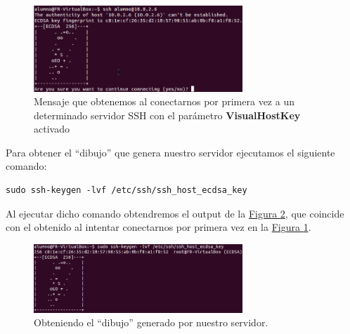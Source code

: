 \documentclass[10pt,a4paper,spanish]{article}
\begin{document}
\begin{figure}[!h]
    \centering
    \includegraphics[width=0.7\textwidth]{visualhostkey}
    \caption{Mensaje que obtenemos al conectarnos por primera vez a un determinado servidor SSH con el parámetro \textbf{VisualHostKey} activado}
    \label{visualhostkey}
\end{figure}

Para obtener el ``dibujo'' que genera nuestro servidor ejecutamos el siguiente comando:
\begin{verbatim}
sudo ssh-keygen -lvf /etc/ssh/ssh_host_ecdsa_key
\end{verbatim}

Al ejecutar dicho comando obtendremos el output de la \hyperref[visualhostkey1]{Figura \ref*{visualhostkey1}}, que coincide con el obtenido al intentar conectarnos por primera vez en la \hyperref[visualhostkey]{Figura \ref*{visualhostkey}}.

\begin{figure}[!h]
    \centering
    \includegraphics[width=0.7\textwidth]{comprobacion_visualkey}
    \caption{Obteniendo el ``dibujo'' generado por nuestro servidor.}
    \label{visualhostkey1}
\end{figure}

 

\end{document}
